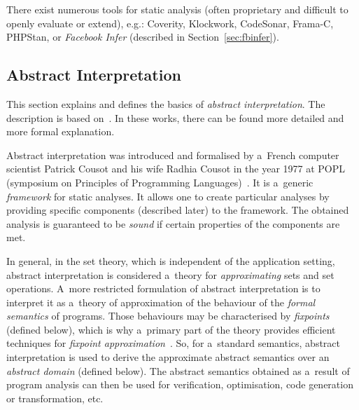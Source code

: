 There exist numerous tools for static analysis (often proprietary and
difficult to openly evaluate or extend), e.g.: Coverity, Klockwork, CodeSonar,
Frama-C, PHPStan, or \emph{Facebook Infer} (described in
Section~\ref{sec:fbinfer}).

\subsection{Abstract Interpretation}


This section explains and defines the basics of \emph{abstract interpretation}.
The description is based on~\cite{AIBasedFormalMethodsCousot,
AILatticeModelCousot, AIInNutshellCousot, AICousotWeb, savAI,
harmimBP, wideningNarrowingCousot, programAnalysisNielson,
staticAnalysisMoller}. In these works, there can be
found more detailed and more formal explanation.

Abstract interpretation was introduced and formalised by a~French
computer scientist Patrick Cousot and his wife Radhia Cousot in the year
1977 at POPL (symposium on Principles of Programming
Languages)~\cite{AILatticeModelCousot}. It is a~generic \emph{framework}
for static analyses. It allows one to create particular analyses by
providing specific components (described later) to the framework. The
obtained analysis is guaranteed to be \emph{sound} if certain properties
of the components are met.~\cite{savAI, harmimBP}

In general, in the set theory, which is independent of the application
setting, abstract interpretation is considered a~theory for
\emph{approximating} sets and set operations. A~more restricted formulation
of abstract interpretation is to interpret it as a~theory of approximation
of the behaviour of the \emph{formal semantics} of programs. Those
behaviours may be characterised by \emph{fixpoints} (defined below), which
is why a~primary part of the theory provides efficient techniques for
\emph{fixpoint approximation}~\cite{programAnalysisNielson}.
So, for a~standard semantics, abstract interpretation is used to derive
the approximate abstract semantics over an \emph{abstract domain} (defined
below). The abstract semantics obtained as a~result of program analysis can
then be used for verification, optimisation, code generation or
transformation, etc.~\cite{AIBasedFormalMethodsCousot}

